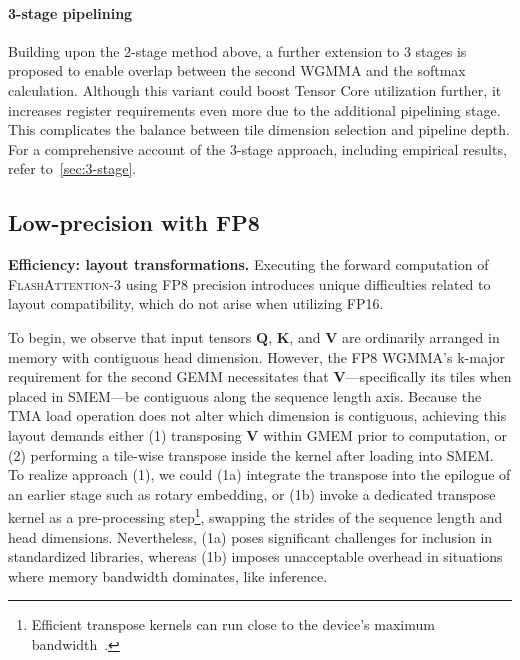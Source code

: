 \begin{algorithm}[H]
\begin{algorithmic}[1]
\paragraph{3-stage pipelining} Building upon the 2-stage method above, a further extension to 3 stages is proposed to enable overlap between the second WGMMA and the softmax calculation. Although this variant could boost Tensor Core utilization further, it increases register requirements even more due to the additional pipelining stage. This complicates the balance between tile dimension selection and pipeline depth. For a comprehensive account of the 3-stage approach, including empirical results, refer to~\cref{sec:3-stage}.

\subsection{Low-precision with FP8}
\label{sec:algofp8}

\textbf{Efficiency: layout transformations.} Executing the forward computation of \textsc{FlashAttention-3} using FP8 precision introduces unique difficulties related to layout compatibility, which do not arise when utilizing FP16.

To begin, we observe that input tensors $\mathbf{Q}$, $\mathbf{K}$, and $\mathbf{V}$ are ordinarily arranged in memory with contiguous head dimension. However, the FP8 WGMMA's k-major requirement for the second GEMM necessitates that $\mathbf{V}$—specifically its tiles when placed in SMEM—be contiguous along the sequence length axis. Because the TMA load operation does not alter which dimension is contiguous, achieving this layout demands either (1) transposing $\mathbf{V}$ within GMEM prior to computation, or (2) performing a tile-wise transpose inside the kernel after loading into SMEM. To realize approach (1), we could (1a) integrate the transpose into the epilogue of an earlier stage such as rotary embedding, or (1b) invoke a dedicated transpose kernel as a pre-processing step\footnote{Efficient transpose kernels can run close to the device's maximum bandwidth~\citep{colfax_cutlass_transpose_2024}.}, swapping the strides of the sequence length and head dimensions. Nevertheless, (1a) poses significant challenges for inclusion in standardized libraries, whereas (1b) imposes unacceptable overhead in situations where memory bandwidth dominates, like inference.


\end{algorithmic}
\end{algorithm}
